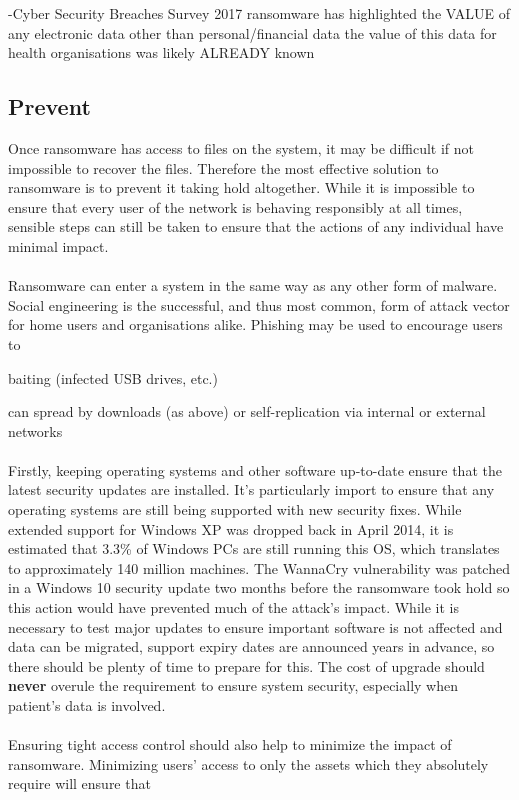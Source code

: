 \documentclass{article}
\begin{document}

-Cyber Security Breaches Survey 2017\cite{security_breaches_survey}
	ransomware has highlighted the VALUE of any electronic data other than personal/financial data
		the value of this data for health organisations was likely ALREADY known

\subsection{Prevent}
Once ransomware has access to files on the system, it may be difficult if not impossible to recover the files. Therefore the most effective solution to ransomware is to prevent it taking hold altogether. While it is impossible to ensure that every user of the network is behaving responsibly at all times, sensible steps can still be taken to ensure that the actions of any individual have minimal impact.
\\\\
Ransomware can enter a system in the same way as any other form of malware.
Social engineering is the successful, and thus most common, form of attack vector for home users and organisations alike. %
Phishing may be used to encourage users to 

baiting (infected USB drives, etc.)

can spread by downloads (as above)
or self-replication via internal or external networks
\\\\
Firstly, keeping operating systems and other software up-to-date ensure that the latest security updates are installed. It's particularly import to ensure that any operating systems are still being supported with new security fixes.
While extended support for Windows XP was dropped back in April 2014, it is estimated that 3.3\% of Windows PCs are still running this OS, which translates to approximately 140 million machines\cite{statcounter}.  The WannaCry vulnerability was patched in a Windows 10 security update\cite{wannacry_patch, windows10march} two months before the ransomware took hold so this action would have prevented much of the attack's impact. While it is necessary to test major updates to ensure important software is not affected and data can be migrated, support expiry dates are announced years in advance\cite{microsoft_lifecycle_factsheet}, so there should be plenty of time to prepare for this. The cost of upgrade should \textbf{never} overule the requirement to ensure system security, especially when patient's data is involved.%
\\\\
Ensuring tight access control should also help to minimize the impact of ransomware. Minimizing users' access to only the assets which they absolutely require will ensure that 
\end{document}
